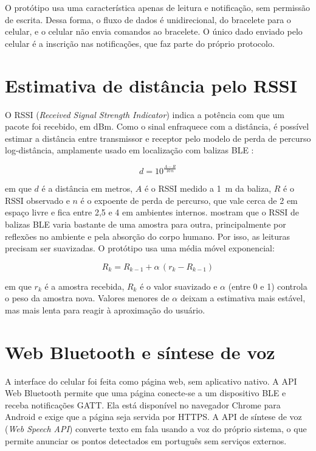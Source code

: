 O protótipo usa uma característica apenas de leitura e notificação, sem permissão de escrita. Dessa forma, o fluxo de dados é unidirecional, do bracelete para o celular, e o celular não envia comandos ao bracelete. O único dado enviado pelo celular é a inscrição nas notificações, que faz parte do próprio protocolo.

\section{Estimativa de distância pelo RSSI}
\label{sec:rssi}

O RSSI (\textit{Received Signal Strength Indicator}) indica a potência com que um pacote foi recebido, em dBm. Como o sinal enfraquece com a distância, é possível estimar a distância entre transmissor e receptor pelo modelo de perda de percurso log-distância, amplamente usado em localização com balizas BLE \cite{faragher2015}:

\begin{equation}
    d = 10^{\frac{A - R}{10\,n}}
    \label{eq:distancia}
\end{equation}

\noindent em que $d$ é a distância em metros, $A$ é o RSSI medido a 1~m da baliza, $R$ é o RSSI observado e $n$ é o expoente de perda de percurso, que vale cerca de 2 em espaço livre e fica entre 2,5 e 4 em ambientes internos.  mostram que o RSSI de balizas BLE varia bastante de uma amostra para outra, principalmente por reflexões no ambiente e pela absorção do corpo humano. Por isso, as leituras precisam ser suavizadas. O protótipo usa uma média móvel exponencial:

\begin{equation}
    R_k = R_{k-1} + \alpha\,(r_k - R_{k-1})
    \label{eq:ema}
\end{equation}

\noindent em que $r_k$ é a amostra recebida, $R_k$ é o valor suavizado e $\alpha$ (entre 0 e 1) controla o peso da amostra nova. Valores menores de $\alpha$ deixam a estimativa mais estável, mas mais lenta para reagir à aproximação do usuário.

\section{Web Bluetooth e síntese de voz}
\label{sec:web}

A interface do celular foi feita como página web, sem aplicativo nativo. A API Web Bluetooth \cite{w3c2024webbluetooth} permite que uma página conecte-se a um dispositivo BLE e receba notificações GATT. Ela está disponível no navegador Chrome para Android e exige que a página seja servida por HTTPS. A API de síntese de voz (\textit{Web Speech API}) \cite{wicg2024speech} converte texto em fala usando a voz do próprio sistema, o que permite anunciar os pontos detectados em português sem serviços externos.

